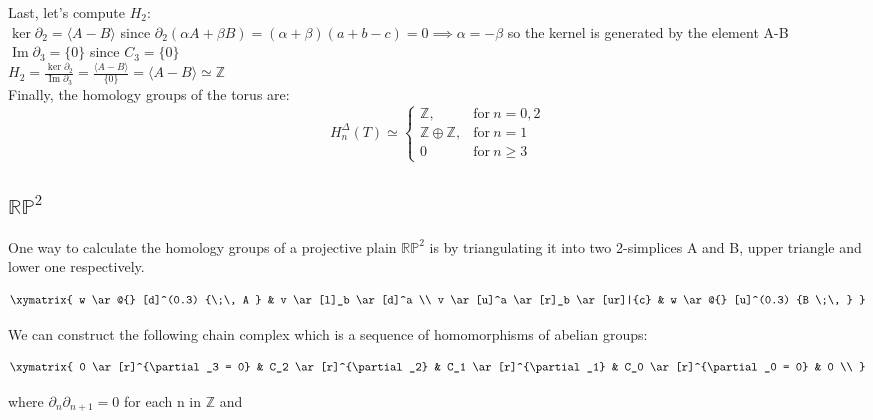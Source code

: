 \documentclass[11pt,a4paper]{report}
\DeclareMathOperator{\Ima}{Im}
\begin{document}
\par
Last, let's compute $H_2$: \\
$\ker\partial_2 = \langle A-B \rangle$ 
		since $\partial_2(\alpha A + \beta B) = (\alpha + \beta) (a+b-c) = 0  \implies \alpha = -\beta$ so the kernel is generated by the element A-B \\
$\Ima\partial_3 = \{0\}$ since $C_3 = \{0\}$ \\ 
$H_2 = \frac{\ker\partial_2}{\Ima\partial_3} = 
		\frac{ \langle A-B \rangle  }{\{0\}} = \langle A-B \rangle \simeq \mathbb{Z}$ \\

Finally, the homology groups of the torus are: 
		\[
	  		H_n^\Delta(T) \simeq \left\{
			      \begin{array}{rl}
			     \mathbb{Z}, & \textrm{for} \: n = 0, 2\\
			     \mathbb{Z} \oplus \mathbb{Z}, & \textrm{for} \: n = 1\\
                        0 & \textrm{for} \: n \geqslant 3
			      \end{array}
			 \right.
	  	\]





 		\subsection{$\mathbb{R} \mathbb{P}^2$}
      
One way to calculate the homology groups of a projective plain $\mathbb{R} \mathbb{P}^2$ is by triangulating it into two 2-simplices A and B, upper triangle and lower one respectively.

	\[
		\xymatrix{
			w \ar @{} [d]^(0.3) {\;\, A }
			& v  \ar[l]_b \ar[d]^a  \\
			v \ar[u]^a \ar[r]_b \ar[ur]|{c} 
			& w \ar @{} [u]^(0.3) {B \;\, } }
	\]
                                                                       
 We can construct the following chain complex which is a sequence of homomorphisms of abelian groups: 

    \[
		\xymatrix{
			0  \ar[r]^{\partial_3 = 0} & 
			C_2  \ar[r]^{\partial_2} & 
			C_1  \ar[r]^{\partial_1} & 
			C_0  \ar[r]^{\partial_0 = 0}
			& 0 \\ }
	\]
	
 where \(\partial_n\partial_{n+1}=0\) for each n  in $\mathbb{Z}$ and 
 
\end{document}
